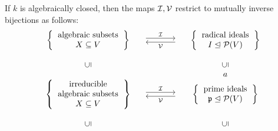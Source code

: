 \begin{theorem}
  If $k$ is algebraically closed, then the maps $\mathcal{I}, \mathcal{V}$ restrict to mutually inverse bijections as follows:
  \[
    \begin{matrix}
        \left\{
          \begin{tabular}{c}
              algebraic subsets \\
              $X \subseteq V$
          \end{tabular}
        \right\}
      & \begin{tikzcd}[column sep = large]
            {}
            \arrow[shift left]{r}{\mc{I}}
          & {}
            \arrow[shift left]{l}{\mc{V}}
        \end{tikzcd}
      & \left\{
          \begin{tabular}{c}
            radical ideals \\
            $I \idealeq \mc{P}(V)$
          \end{tabular}
        \right\}
      \\
        {}
      & {}
      & {}
      \\
        \rotatebox[origin=c]{90}{$\subseteq$}
      & {}
      & \rotatebox[origin=c]{90}{$\subseteq$}
      \\
        {}
      & {}
      & {}a
      \\
        \left\{
          \begin{tabular}{c}
              irreducible \\
              algebraic subsets \\
              $X \subseteq V$
          \end{tabular}
        \right\}
      & \begin{tikzcd}[column sep = large]
            {}
            \arrow[shift left]{r}{\mc{I}}
          & {}
            \arrow[shift left]{l}{\mc{V}}
        \end{tikzcd}
      & \left\{
          \begin{tabular}{c}
            prime ideals \\
            $\mf{p} \idealeq \mc{P}(V)$
          \end{tabular}
        \right\}
      \\
        {}
      & {}
      & {}
      \\
        \rotatebox[origin=c]{90}{$\subseteq$}
      & {}
      & \rotatebox[origin=c]{90}{$\subseteq$}
      \\
        {}
      & {}
      & {}
      \\

\end{matrix}\]
\end{theorem}
